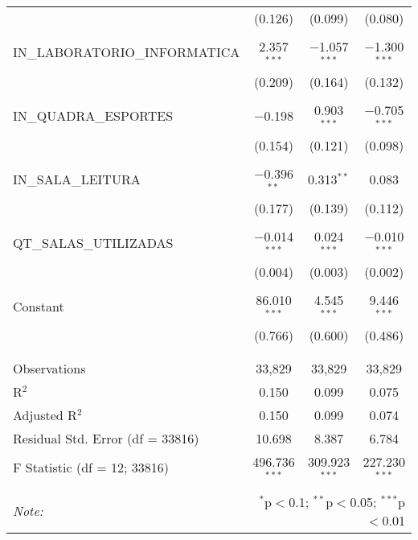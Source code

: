 \begin{table}[!htbp]
\begin{tabular}{@{\extracolsep{5pt}}lccc}
  & (0.126) & (0.099) & (0.080) \\ 
  & & & \\ 
 IN\_LABORATORIO\_INFORMATICA & 2.357$^{***}$ & $-$1.057$^{***}$ & $-$1.300$^{***}$ \\ 
  & (0.209) & (0.164) & (0.132) \\ 
  & & & \\ 
 IN\_QUADRA\_ESPORTES & $-$0.198 & 0.903$^{***}$ & $-$0.705$^{***}$ \\ 
  & (0.154) & (0.121) & (0.098) \\ 
  & & & \\ 
 IN\_SALA\_LEITURA & $-$0.396$^{**}$ & 0.313$^{**}$ & 0.083 \\ 
  & (0.177) & (0.139) & (0.112) \\ 
  & & & \\ 
 QT\_SALAS\_UTILIZADAS & $-$0.014$^{***}$ & 0.024$^{***}$ & $-$0.010$^{***}$ \\ 
  & (0.004) & (0.003) & (0.002) \\ 
  & & & \\ 
 Constant & 86.010$^{***}$ & 4.545$^{***}$ & 9.446$^{***}$ \\ 
  & (0.766) & (0.600) & (0.486) \\ 
  & & & \\ 
\hline \\[-1.8ex] 
Observations & 33,829 & 33,829 & 33,829 \\ 
R$^{2}$ & 0.150 & 0.099 & 0.075 \\ 
Adjusted R$^{2}$ & 0.150 & 0.099 & 0.074 \\ 
Residual Std. Error (df = 33816) & 10.698 & 8.387 & 6.784 \\ 
F Statistic (df = 12; 33816) & 496.736$^{***}$ & 309.923$^{***}$ & 227.230$^{***}$ \\ 
\hline 
\hline \\[-1.8ex] 
\textit{Note:}  & \multicolumn{3}{r}{$^{*}$p$<$0.1; $^{**}$p$<$0.05; $^{***}$p$<$0.01} \\ 
\end{tabular} 
\end{table} 
